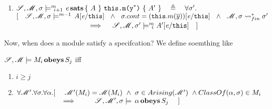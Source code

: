 \begin{definition}
\begin{enumerate}
\item
$ {\mathcal{S}}, {\mathcal M}, \sigma \models^{m} \!\!\!\!_{i+1} \ {\mathit{e}\, \textbf{sats} \, \{ \ A  \ \} \   \mbox{\normalfont{\texttt{this.m(y}}}^*\mbox{\normalfont{\texttt{)}}} \  \{ \  A'  \ \} }
 \ \ \ \triangleq \ \ \
 \forall \sigma'. $\\
$ [ \  \  \ \satM   {\sigma} {m-1}  {A[\re/\prg{this}]}\ \ \wedge\ \  \sigma.cont=(\prg{this}.m(\overline y))[\re/\prg{this}] \ \ \wedge\ \
\Mod, \sigma\leadsto^*_{fin} \sigma'  $\\
$\strut \hspace{3cm} \hfill \ \   \ \  \  \Longrightarrow\ \ \ \  \satMN  {\sigma'} m {i}  {A'[\re/\prg{this}] }\ \ \ ]$

\end{enumerate}

 \end{definition} 
 
 Now, when does a module satisfy a specifcation? We define soemthing like
 
 \begin{definition}
 
 ${\mathcal{S}}, {\mathcal M} \models M_i\, \textbf{obeys} \, S_j$ iff
 
 \begin{enumerate}
 \item
 $i\geq j $ %
 \item 
 $\forall {\mathcal M}'.\forall \sigma.\forall \alpha.[\ \ \ \  {\mathcal M}' (M_i)={\mathcal M} (M_i)\ \wedge\  \sigma \in Arising({\mathcal M}') \ \wedge ClassOf(\alpha,\sigma)\in M_i$\\
 $\ \  \strut \hspace{2cm}\Longrightarrow \ \ \  \
\ \ \ \  \satLong \Spec {\Mod'} \sigma {\obeys \alpha {S_j}}\ \ \ \ ]$

\end{enumerate}

 \end{definition} 
 
